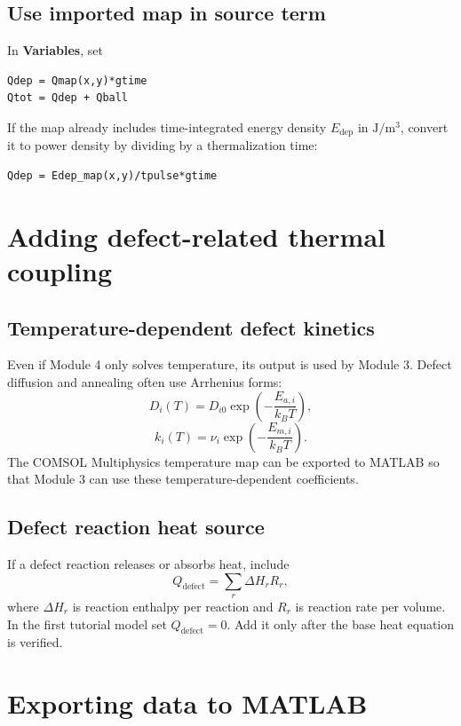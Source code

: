 \documentclass[11pt]{article}
\newcommand{\COMSOL}{COMSOL Multiphysics}
\newcommand{\comsol}{\COMSOL}
\newcommand{\menu}[1]{\textbf{#1}}
\begin{document}
\subsection{Use imported map in source term}
In \menu{Variables}, set
\begin{lstlisting}
Qdep = Qmap(x,y)*gtime
Qtot = Qdep + Qball
\end{lstlisting}
If the map already includes time-integrated energy density \(E_{\mathrm{dep}}\) in \(\mathrm{J/m^3}\), convert it to power density by dividing by a thermalization time:
\begin{lstlisting}
Qdep = Edep_map(x,y)/tpulse*gtime
\end{lstlisting}

\section{Adding defect-related thermal coupling}

\subsection{Temperature-dependent defect kinetics}
Even if Module 4 only solves temperature, its output is used by Module 3.  Defect diffusion and annealing often use Arrhenius forms:
\begin{equation}
D_i(T)=D_{i0}\exp\left(-\frac{E_{a,i}}{k_BT}\right),
\end{equation}
\begin{equation}
k_i(T)=\nu_i\exp\left(-\frac{E_{m,i}}{k_BT}\right).
\end{equation}
The \comsol{} temperature map can be exported to MATLAB so that Module 3 can use these temperature-dependent coefficients.

\subsection{Defect reaction heat source}
If a defect reaction releases or absorbs heat, include
\begin{equation}
Q_{\mathrm{defect}}=\sum_r \Delta H_r R_r,
\end{equation}
where \(\Delta H_r\) is reaction enthalpy per reaction and \(R_r\) is reaction rate per volume.  In the first tutorial model set \(Q_{\mathrm{defect}}=0\).  Add it only after the base heat equation is verified.

\section{Exporting data to MATLAB}
\end{document}

